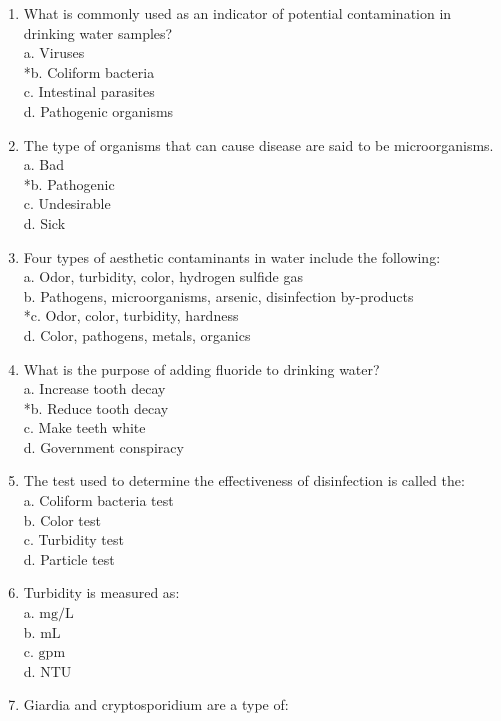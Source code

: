 \begin{enumerate}[1.]
\item What is commonly used as an indicator of potential contamination in drinking water samples?\\
a. Viruses\\
*b. Coliform bacteria\\
c. Intestinal parasites\\
d. Pathogenic organisms\\
\item The type of organisms that can cause disease are said to be microorganisms.\\
a. Bad\\
*b. Pathogenic\\
c. Undesirable\\
d. Sick\\
\item Four types of aesthetic contaminants in water include the following:\\
a. Odor, turbidity, color, hydrogen sulfide gas\\
b. Pathogens, microorganisms, arsenic, disinfection by-products\\
*c. Odor, color, turbidity, hardness\\
d. Color, pathogens, metals, organics\\
\item What is the purpose of adding fluoride to drinking water?\\
a. Increase tooth decay\\
*b. Reduce tooth decay\\
c. Make teeth white\\
d. Government conspiracy\\
\item The test used to determine the effectiveness of disinfection is called the:\\
a. Coliform bacteria test\\
b. Color test\\
c. Turbidity test\\
d. Particle test\\
\item Turbidity is measured as:\\
a. $\mathrm{mg} / \mathrm{L}$\\
b. $\mathrm{mL}$\\
c. $\mathrm{gpm}$\\
d. NTU\\
\item Giardia and cryptosporidium are a type of:\\

\end{enumerate}

